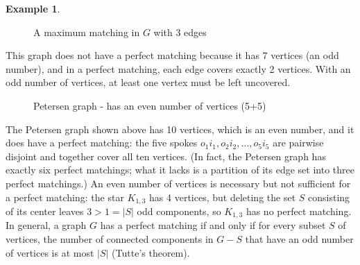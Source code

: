 \documentclass{article}
\theoremstyle{definition}
\newtheorem{example}{Example}
\begin{document}
\begin{example}
\begin{figure}[h]
\begin{tikzpicture}[scale=1.2]
\end{tikzpicture}
\caption{A maximum matching in $G$ with 3 edges}
\label{fig:maximum-matching}
\end{figure}

This graph does not have a perfect matching because it has 7 vertices (an odd number), and in a perfect matching, each edge covers exactly 2 vertices. With an odd number of vertices, at least one vertex must be left uncovered.

\begin{figure}[h]
\centering
{}
\caption{Petersen graph - has an even number of vertices (5+5)}
\label{fig:petersen-perfect-matching}
\end{figure}

The Petersen graph shown above has 10 vertices, which is an even number, and it does have a perfect matching: the five spokes $o_1 i_1, o_2 i_2, \ldots, o_5 i_5$ are pairwise disjoint and together cover all ten vertices. (In fact, the Petersen graph has exactly six perfect matchings; what it lacks is a partition of its edge set into three perfect matchings.) An even number of vertices is necessary but not sufficient for a perfect matching: the star $K_{1,3}$ has 4 vertices, but deleting the set $S$ consisting of its center leaves $3 > 1 = |S|$ odd components, so $K_{1,3}$ has no perfect matching. In general, a graph $G$ has a perfect matching if and only if for every subset $S$ of vertices, the number of connected components in $G - S$ that have an odd number of vertices is at most $|S|$ (Tutte's theorem).
\end{example}
\end{document}
